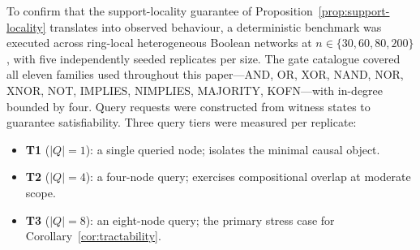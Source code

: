 \documentclass[11pt]{article}
\theoremstyle{definition}
\begin{document}
To confirm that the support-locality guarantee of Proposition~\ref{prop:support-locality}
translates into observed behaviour, a deterministic benchmark was executed across ring-local
heterogeneous Boolean networks at \(n\in\{30,60,80,200\}\), with five independently seeded
replicates per size. The gate catalogue covered all eleven families used throughout this paper---AND,
OR, XOR, NAND, NOR, XNOR, NOT, IMPLIES, NIMPLIES, MAJORITY, KOFN---with in-degree bounded by
four. Query requests were constructed from witness states to guarantee satisfiability. Three query
tiers were measured per replicate:
\begin{itemize}
\item \textbf{T1} (\(|Q|=1\)): a single queried node; isolates the minimal causal object.
\item \textbf{T2} (\(|Q|=4\)): a four-node query; exercises compositional overlap at moderate scope.
\item \textbf{T3} (\(|Q|=8\)): an eight-node query; the primary stress case for
  Corollary~\ref{cor:tractability}.
\end{itemize}
\end{document}
